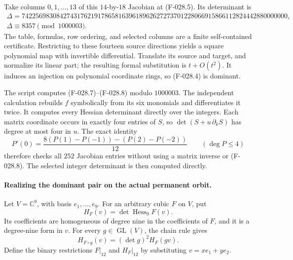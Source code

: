 Take columns \(0,1,\ldots,13\) of this \(14\)-by-\(18\)
Jacobian at (F-028.5). Its determinant is
\[
 \begin{gathered}
 \Delta=
 74225698308427431762191786581639618962627273701228066915866112824442880000000,
 \\
                       \Delta\equiv8357\pmod{1000003}.
 \end{gathered}                                                 \tag{F-028.9}
\]
The table, formulas, row ordering, and selected columns
are a finite self-contained certificate.
Restricting to these fourteen source directions yields
a square polynomial map with invertible differential.
Translate its source and target, and normalize its linear
part; the resulting formal substitution is \(t+O(t^2)\).
It induces an injection on polynomial coordinate rings,
so (F-028.4) is dominant.

The script
computes (F-028.7)--(F-028.8) modulo \(1000003\).
The independent calculation
rebuilds \(f\) symbolically from its six monomials and
differentiates it twice. It computes every Hessian
determinant directly over the integers. Each matrix
coordinate occurs in exactly four entries of \(S\),
so \(\det(S+u\,\partial_kS)\) has degree at most four in \(u\).
The exact identity
\[
 P'(0)=
       \frac{8(P(1)-P(-1))-(P(2)-P(-2))}{12}
                     \qquad(\deg P\leq4)
\]
therefore checks all \(252\) Jacobian entries without
using a matrix inverse or (F-028.8).
The selected integer determinant is then computed directly.

\paragraph{Realizing the dominant pair on the actual permanent orbit.}
Let \(V=\mathbb C^9\), with basis \(e_1,\ldots,e_9\).
For an arbitrary cubic \(F\) on \(V\), put
\[
 H_F(v)=\det\operatorname{Hess}_9F(v).
 \]
Its coefficients are homogeneous of degree nine in
the coefficients of \(F\), and it is a degree-nine
form in \(v\). For every \(g\in\operatorname{GL}(V)\),
the chain rule gives
\[
 H_{F\circ g}(v)=(\det g)^2 H_F(gv).
                                                               \tag{F-028.10}
\]
Define the binary restrictions \(F|_{12}\) and \(H_F|_{12}\)
by substituting \(v=xe_1+ye_2\).


